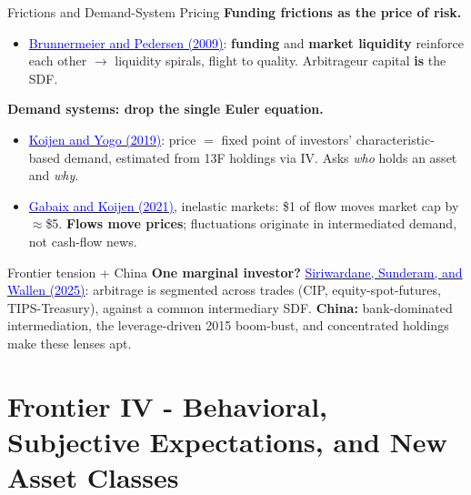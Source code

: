 \documentclass{beamer}
\begin{document}
\begin{frame}{Frictions and Demand-System Pricing}
\textbf{Funding frictions as the price of risk.}
\begin{itemize}
  \item \href{https://doi.org/10.1093/rfs/hhn098}{\textcolor{blue}{Brunnermeier and Pedersen (2009)}}: \textbf{funding} and \textbf{market liquidity} reinforce each other $\rightarrow$ \alert{liquidity spirals}, flight to quality. Arbitrageur capital \textbf{is} the SDF.
\end{itemize}
\textbf{Demand systems: drop the single Euler equation.}
\begin{itemize}
  \item \href{https://doi.org/10.1086/701683}{\textcolor{blue}{Koijen and Yogo (2019)}}: price $=$ \alert{fixed point} of investors' characteristic-based demand, estimated from 13F holdings via IV. Asks \emph{who} holds an asset and \emph{why}.
  \item \href{https://doi.org/10.3386/w28967}{\textcolor{blue}{Gabaix and Koijen (2021)}}, inelastic markets: \$1 of flow moves market cap by $\approx$\$5. \textbf{Flows move prices}; fluctuations originate in intermediated demand, not cash-flow news.
\end{itemize}
\begin{block}{Frontier tension + China}
\textbf{One marginal investor?} \href{https://doi.org/10.1111/jofi.13469}{\textcolor{blue}{Siriwardane, Sunderam, and Wallen (2025)}}: arbitrage is \alert{segmented} across trades (CIP, equity-spot-futures, TIPS-Treasury), against a common intermediary SDF. \textbf{China:} bank-dominated intermediation, the leverage-driven 2015 boom-bust, and concentrated holdings make these lenses apt.
\end{block}
\end{frame}

\section{Frontier IV - Behavioral, Subjective Expectations, and New Asset Classes}
\end{document}
